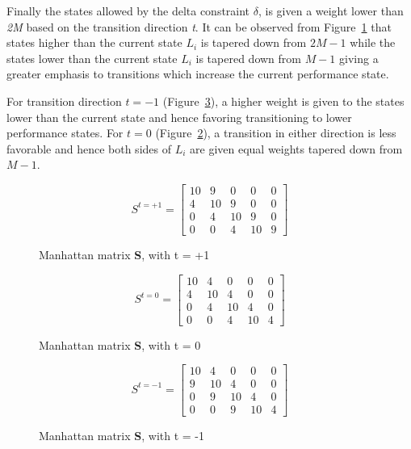 Finally the states allowed by the delta constraint $\delta$, is given a weight lower than
\textit{2M} based on the transition direction \textit{t}. It can be observed from Figure~\ref{fig:ex_dmuth} 
that states higher than the current state $L_{i}$ is tapered down from $2M-1$ while the states
lower than the current state $L_{i}$ is tapered down from $M-1$ giving a greater emphasis to transitions 
which increase the current performance state.

For transition direction $t = -1$ (Figure~\ref{fig:ex_dmutl}), 
a higher weight is given to the states lower than the current state and hence favoring 
transitioning to lower performance states. For $t = 0$ (Figure~\ref{fig:ex_dmut0}), 
a transition in either direction is less favorable and hence both sides of $L_{i}$ 
are given equal weights tapered down from $M-1$.


\begin{figure}[h!]
\centering
\begin{equation*}
    S^{t = +1} = \left[
     \begin{array}{ccccc}
       10 & 9 & 0 & 0 & 0 \\
       4 & 10 & 9 & 0 & 0 \\
       0 & 4 & 10 & 9 & 0 \\
       0 & 0 & 4 & 10 & 9
     \end{array}
   \right]
\end{equation*}
\caption{Manhattan matrix \textbf{S}, with t = +1}
\label{fig:ex_dmuth}
\end{figure}

\begin{figure}[h!]
\centering
\begin{equation*}
    S^{t = 0} = \left[
     \begin{array}{ccccc}
       10 & 4 & 0 & 0 & 0 \\
       4 & 10 & 4 & 0 & 0 \\
       0 & 4 & 10 & 4 & 0 \\
       0 & 0 & 4 & 10 & 4
     \end{array}
   \right]
\end{equation*}
\caption{Manhattan matrix \textbf{S}, with t = 0}
\label{fig:ex_dmut0}
\end{figure}

\begin{figure}[h!]
\centering
\begin{equation*}
    S^{t = -1} = \left[
     \begin{array}{ccccc}
       10 & 4 & 0 & 0 & 0 \\
       9 & 10 & 4 & 0 & 0 \\
       0 & 9 & 10 & 4 & 0 \\
       0 & 0 & 9 & 10 & 4
     \end{array}
   \right]
\end{equation*}
\caption{Manhattan matrix \textbf{S}, with t = -1}
\label{fig:ex_dmutl}
\end{figure}

